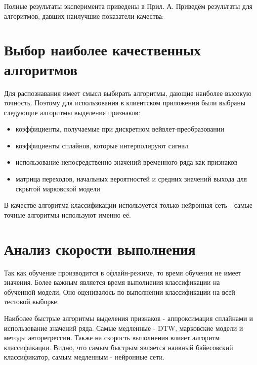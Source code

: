 Полные результаты эксперимента приведены в Прил. А. Приведём результаты для алгоритмов, давших наилучшие показатели качества:



\section{Выбор наиболее качественных алгоритмов}

Для распознавания имеет смысл выбирать алгоритмы, дающие наиболее высокую точность.
Поэтому для использования в клиентском приложении были выбраны следующие алгоритмы выделения признаков:

\begin{itemize}
\item коэффициенты, получаемые при дискретном вейвлет-преобразовании
\item коэффициенты сплайнов, которые интерполируют сигнал
\item использование непосредственно значений временного ряда как признаков
\item матрица переходов, начальных вероятностей и средних значений выхода для скрытой марковской модели
\end{itemize}

В качестве алгоритма классификации используется только нейронная сеть - самые точные алгоритмы используют именно её.


\section{Анализ скорости выполнения}

Так как обучение производится в офлайн-режиме, то время обучения не имеет значения. Более важным является время выполнения классификации на обученной модели. Оно оценивалось по выполнении классификации на всей тестовой выборке.

Наиболее быстрые алгоритмы выделения признаков - аппроксимация сплайнами и использование значений ряда. Самые медленные - DTW, марковские модели и методы авторегрессии. Также на скорость выполнения влияет алгоритм классификации. Видно, что самым быстрым является наивный байесовский классификатор, самым медленным - нейронные сети.



